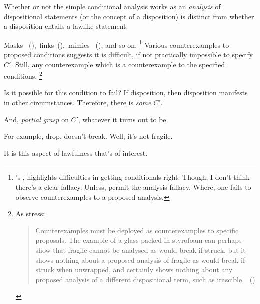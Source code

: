 \begin{note}
  Whether or not the simple conditional analysis works as an \emph{analysis} of dispositional statements (or the concept of a disposition) is distinct from whether a disposition entails a lawlike statement.

  Masks ~(\cite{Johnston:1992aa}),~finks~(\cite{Martin:1994aa}),~mimics~ (\cite{Lewis:1997wg}), and so on.%
  \footnote{
    \citeauthor{Shope:1978aa}'s , highlights difficulties in getting conditionals right.
    Though, I don't think there's a clear fallacy.
    Unless, permit the analysis fallacy.
    Where, one fails to observe counterexamples to a proposed analysis.
  }
  Various counterexamples to proposed conditions suggests it is difficult, if not practically impossible to specify \(C'\).
  Still, any counterexample which is a counterexample to the specified conditions.%
  \footnote{
    As \citeauthor{Bonevac:2011tz} stress:
    \begin{quote}
      Counterexamples must be deployed as counterexamples to specific proposals.
      The example of a glass packed in styrofoam can perhaps show that fragile cannot be analysed as would break if struck, but it shows nothing about a proposed analysis of fragile as would break if struck when unwrapped, and certainly shows nothing about any proposed analysis of a different dispositional term, such as irascible.%
      \mbox{ }\hfill\mbox{(\citeyear[1144]{Bonevac:2011tz})}
    \end{quote}
  }%

  Is it possible for this condition to fail?
  If disposition, then disposition manifests in other circumstances.
  Therefore, there is \emph{some} \(C'\).

  And, \emph{partial grasp} on \(C'\), whatever it turns out to be.

  For example, drop, doesn't break.
  Well, it's not fragile.

  It is this aspect of lawfulness that's of interest.
\end{note}

